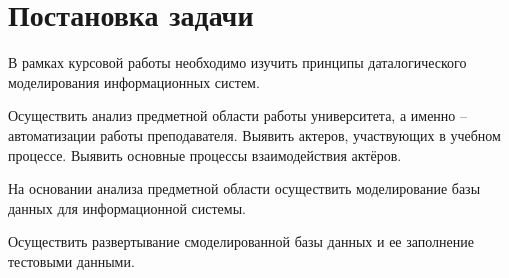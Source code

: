 \section{Постановка задачи}
\label{sec:practice:task_statement}

В рамках курсовой работы необходимо изучить принципы даталогического моделирования информационных систем. 

Осуществить анализ предметной области работы университета, а именно -- автоматизации работы преподавателя. Выявить актеров, участвующих в учебном процессе. Выявить основные процессы взаимодействия актёров. 

На основании анализа предметной области осуществить моделирование базы данных для информационной системы.

Осуществить развертывание смоделированной базы данных и ее заполнение тестовыми данными.
